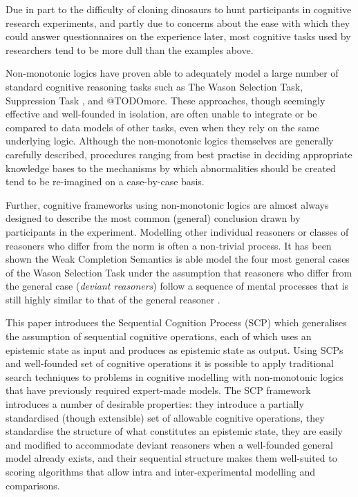 \documentclass{article}
\begin{document}
Due in part to the difficulty of cloning dinosaurs to hunt participants in cognitive research experiments, and partly due to concerns about the ease with which they could answer questionnaires on the experience later, most cognitive tasks used by researchers tend to be more dull than the examples above.

Non-monotonic logics have proven able to adequately model a large number of standard cognitive reasoning tasks such as The Wason Selection Task\citep{wason1968reasoning}, Suppression Task \citep{byrne1989suppressing}, and @TODOmore. These approaches, though seemingly effective and well-founded in isolation, are often unable to integrate or be compared to data models of other tasks, even when they rely on the same underlying logic. Although the non-monotonic logics themselves are generally carefully described, procedures ranging from best practise in deciding appropriate knowledge bases to the mechanisms by which abnormalities should be created tend to be re-imagined on a case-by-case basis.

Further, cognitive frameworks using non-monotonic logics are almost always designed to describe the most common (general) conclusion drawn by participants in the experiment. Modelling other individual reasoners or classes of reasoners who differ from the norm is often a non-trivial process. It has been shown the Weak Completion Semantics is able model the four most general cases of the Wason Selection Task under the assumption that reasoners who differ from the general case (\textit{deviant reasoners}) follow a sequence of mental processes that is still highly similar to that of the general reasoner \citep{breu2019weak}.

This paper introduces the Sequential Cognition Process (SCP) which generalises the assumption of sequential cognitive operations, each of which uses an epistemic state as input and produces as epistemic state as output. Using SCPs and well-founded set of cognitive operations it is possible to apply traditional search techniques to problems in cognitive modelling with non-monotonic logics that have previously required expert-made models. The SCP framework introduces a number of desirable properties: they introduce a partially standardised (though extensible) set of allowable cognitive operations, they standardise the structure of what constitutes an epistemic state, they are easily and modified to accommodate deviant reasoners when a well-founded general model already exists, and their sequential structure makes them well-suited to scoring algorithms that allow intra and inter-experimental modelling and comparisons.
\end{document}
